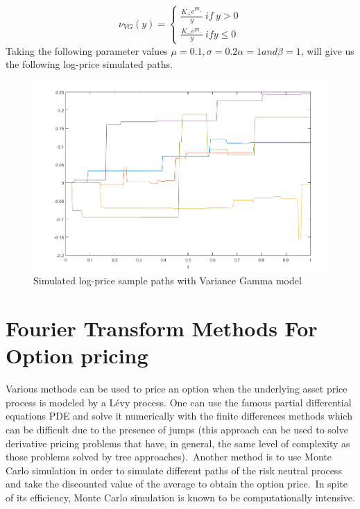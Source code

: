 \documentclass[12pt]{report}
\begin{document}
 \[\nu_{VG}(y)= \begin{cases} 
  \frac{K_+ e^{y \eta_+}}{y}~ if ~y >0 \\
    
    \frac{K_- e^{y \eta_-}}{y}~ if y \leq 0 
         \end{cases}
          \]
Taking the following parameter values $\mu= 0.1,\sigma=0.2 \alpha=1 and \beta=1   $, will give us the following log-price simulated paths.
\begin{figure}[h]

\centering
\includegraphics[scale=0.7]{VG.png} 
\caption{Simulated log-price sample paths with Variance Gamma model }
\end{figure}


\chapter{Fourier Transform Methods For Option pricing }

Various methods can be used to price an option when the underlying
asset price process is modeled by a Lévy process. One can use the famous partial differential equations PDE  and solve it numerically with the finite differences methods which  can be difficult due to the presence of jumps (this approach can be used to solve derivative pricing problems that have, in general, the same level of complexity as those problems solved by tree approaches).~Another method is to use Monte Carlo simulation in order to simulate different paths of the risk neutral process and take the discounted value of the average to obtain the option price.~In spite of its efficiency, Monte Carlo simulation is known to be computationally intensive. \\
\end{document}
